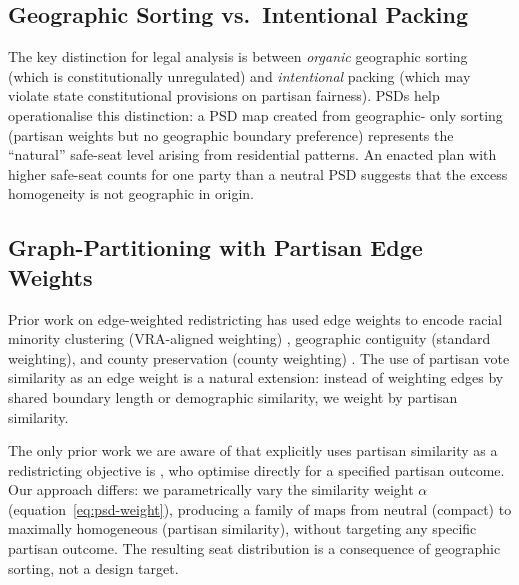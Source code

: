 \subsection{Geographic Sorting vs.\ Intentional Packing}

The key distinction for legal analysis is between \emph{organic} geographic
sorting (which is constitutionally unregulated) and \emph{intentional} packing
(which may violate state constitutional provisions on partisan fairness).
PSDs help operationalise this distinction: a PSD map created from geographic-
only sorting (partisan weights but no geographic boundary preference) represents
the ``natural'' safe-seat level arising from residential patterns.  An enacted
plan with higher safe-seat counts for one party than a neutral PSD suggests
that the excess homogeneity is not geographic in origin.

\subsection{Graph-Partitioning with Partisan Edge Weights}

Prior work on edge-weighted redistricting has used edge weights to encode
racial minority clustering (VRA-aligned weighting) \citep{dellib2026vra},
geographic contiguity (standard weighting), and county preservation (county
weighting) \citep{dellib2026county}.  The use of partisan vote similarity as
an edge weight is a natural extension: instead of weighting edges by shared
boundary length or demographic similarity, we weight by partisan similarity.

The only prior work we are aware of that explicitly uses partisan similarity
as a redistricting objective is \citet{gurnee2021fairmandering}, who optimise
directly for a specified partisan outcome.  Our approach differs: we
parametrically vary the similarity weight $\alpha$ (equation~\eqref{eq:psd-weight}),
producing a family of maps from neutral (compact) to maximally homogeneous
(partisan similarity), without targeting any specific partisan outcome.  The
resulting seat distribution is a consequence of geographic sorting, not a
design target.
